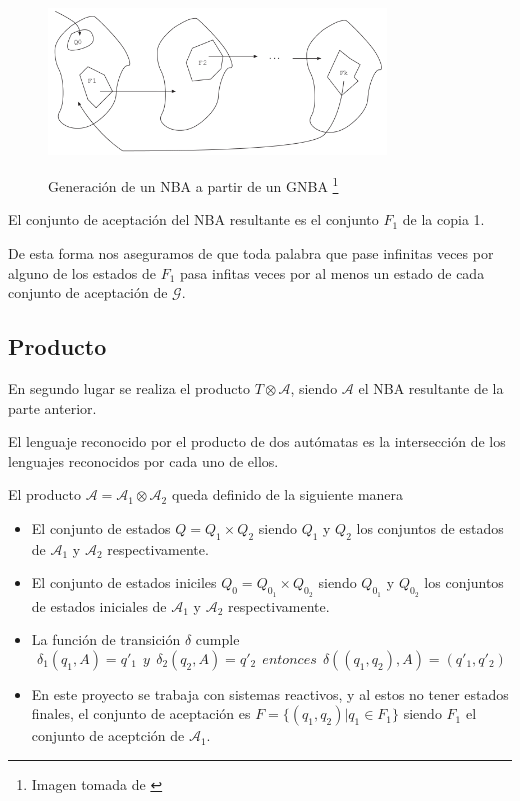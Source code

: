 \begin{figure}[hbtp]
\begin{minipage}{\textwidth}
\begin{center}
\caption[Generación de un NBA a partir de un GNBA]%
{Generación de un NBA a partir de un GNBA \footnote[1]{Imagen tomada de \cite{katoen}}}
\includegraphics[width=0.8\textwidth]{ltl/imagenes/figura4_20.png}
\label{fig:GNBA_to_NBA}
\end{center}
\end{minipage}
\end{figure}

El conjunto de aceptación del NBA resultante es el conjunto $F_1$ de la copia 1.

De esta forma nos aseguramos de que toda palabra que pase infinitas veces por alguno de los estados
 de $F_1$ pasa infitas veces por al menos un estado de cada conjunto de aceptación de $\mathcal{G}$.



\subsection{Producto}

En segundo lugar se realiza el producto $T \otimes \mathcal{A}$, siendo $\mathcal{A}$ el NBA resultante
 de la parte anterior.

El lenguaje reconocido por el producto de dos autómatas es la intersección de los lenguajes reconocidos
 por cada uno de ellos.

El producto $\mathcal{A} = \mathcal{A}_1 \otimes \mathcal{A}_2 $ queda definido de la siguiente manera
\begin{itemize}
\item El conjunto de estados $Q = Q_1 \times Q_2$ siendo $Q_1$ y $Q_2$ los conjuntos de estados de
 $\mathcal{A}_1$ y $\mathcal{A}_2$ respectivamente.
\item El conjunto de estados iniciles $Q_0 = Q_{0_1} \times Q_{0_2}$ siendo $Q_{0_1}$ y $Q_{0_2}$ los conjuntos
 de estados iniciales de $\mathcal{A}_1$ y $\mathcal{A}_2$ respectivamente.
\item La función de transición $\delta$ cumple
\[  \delta_1(q_1, A) = q'_1 ~~  y ~~ \delta_2(q_2, A) = q'_2 ~~ entonces ~~ \delta((q_1,q_2), A) = (q'_1,q'_2)\]
\item En este proyecto se trabaja con sistemas reactivos, y al estos no tener estados finales, el conjunto de
 aceptación es $F= \{ (q_1,q_2) | q_1 \in F_1 \}$ siendo $F_1$ el conjunto de aceptción de $\mathcal{A}_1$.
\end{itemize}


